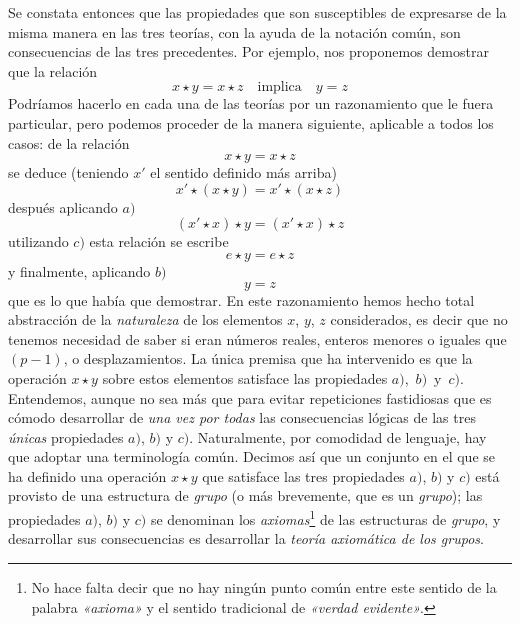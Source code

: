 \documentclass[a4paper, 12pt, draft]{article}
\begin{document}
Se constata entonces que las propiedades que son susceptibles de expresarse de la misma manera en las tres teorías, con la ayuda de la notación común, son consecuencias de las tres precedentes. Por ejemplo, nos proponemos demostrar que la relación $$ x\star y=x\star z\quad \text{implica}\quad y=z $$ Podríamos hacerlo en cada una de las teorías por un razonamiento que le fuera particular, pero podemos proceder de la manera siguiente, aplicable a todos los casos: de la relación $$ x\star y=x\star z $$ se deduce (teniendo $x'$ el sentido definido más arriba) $$ x'\star (x\star y)=x'\star (x\star z) $$ después aplicando $a)$ $$ (x'\star x)\star y=(x'\star x)\star z $$ utilizando $c)$ esta relación se escribe $$ e\star y= e\star z $$ y finalmente, aplicando $b)$ $$ y =z $$ que es lo que había que demostrar. En este razonamiento hemos hecho total abstracción de la \textit{naturaleza} de los elementos $x$, $y$, $z$ considerados, es decir que no tenemos necesidad de saber si eran números reales, enteros menores o iguales que $(p-1)$, o desplazamientos. La única premisa que ha intervenido es que la operación $x\star y$ sobre estos elementos satisface las propiedades \mbox{$a)$, $b)$ y~$c)$.} Entendemos, aunque no sea más que para evitar repeticiones fastidiosas que es cómodo desarrollar de \textit{una vez por todas} las consecuencias lógicas de las tres \textit{únicas} propiedades $a)$, $b)$ y $c)$. Naturalmente, por comodidad de lenguaje, hay que adoptar una terminología común. Decimos así que un conjunto en el que se ha definido una operación $x\star y$ que satisface las tres propiedades $a)$, $b)$ y $c)$ está provisto de una estructura de \textit{grupo} (o más brevemente, que es un \textit{grupo}); las propiedades $a)$, $b)$ y $c)$ se denominan los \textit{axiomas}\footnote{No hace falta decir que no hay ningún punto común entre este sentido de la palabra \textit{«axioma»} y el sentido tradicional de \textit{«verdad evidente»}.} de las estructuras de \textit{grupo}, y desarrollar sus consecuencias es desarrollar la \textit{teoría axiomática de los grupos}. 
\end{document}
